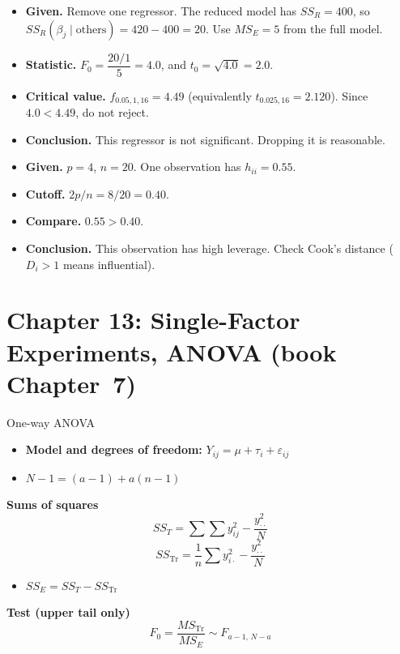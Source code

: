 \begin{example}
\begin{itemize}
  \item \textbf{Given.} Remove one regressor. The reduced model has $SS_R=400$, so $SS_R(\beta_j\mid\text{others})=420-400=20$. Use $MS_E=5$ from the full model.
  \item \textbf{Statistic.} $F_0=\dfrac{20/1}{5}=4.0$, and $t_0=\sqrt{4.0}=2.0$.
  \item \textbf{Critical value.} $f_{0.05,1,16}=4.49$ (equivalently $t_{0.025,16}=2.120$). Since $4.0<4.49$, do not reject.
  \item \textbf{Conclusion.} This regressor is not significant. Dropping it is reasonable.
\end{itemize}
\end{example}

\begin{example}
\begin{itemize}
  \item \textbf{Given.} $p=4$, $n=20$. One observation has $h_{ii}=0.55$.
  \item \textbf{Cutoff.} $2p/n=8/20=0.40$.
  \item \textbf{Compare.} $0.55>0.40$.
  \item \textbf{Conclusion.} This observation has high leverage. Check Cook's distance ($D_i>1$ means influential).
\end{itemize}
\end{example}

\section{Chapter 13: Single-Factor Experiments, ANOVA (book Chapter~7)}

\begin{formulabox}{One-way ANOVA}
\begin{itemize}
  \item \textbf{Model and degrees of freedom:} $Y_{ij}=\mu+\tau_i+\varepsilon_{ij}$
  \item $N-1=(a-1)+a(n-1)$
\end{itemize}
\textbf{Sums of squares}
\[ SS_T=\sum\sum y_{ij}^2-\frac{y_{\cdot\cdot}^2}{N} \]
\[ SS_{\text{Tr}}=\frac1n\sum y_{i\cdot}^2-\frac{y_{\cdot\cdot}^2}{N} \]
\begin{itemize}
  \item $SS_E=SS_T-SS_{\text{Tr}}$
\end{itemize}
\textbf{Test (upper tail only)}
\[ F_0=\frac{MS_{\text{Tr}}}{MS_E}\sim F_{a-1,\,N-a} \]
\end{formulabox}

